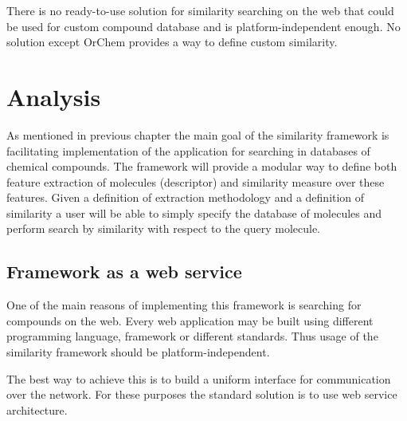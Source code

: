 \documentclass[thesis=M,english]{FITthesis}[2012/10/20]
\begin{document}
There is no ready-to-use solution for similarity searching on the web that could be used for custom compound database and is platform-independent enough. No solution except OrChem provides a way to define custom similarity. 


\chapter{Analysis}
As mentioned in previous chapter the main goal of the similarity framework is facilitating implementation of the application for searching in databases of chemical compounds. The framework will provide a modular way to define both feature extraction of molecules (descriptor) and similarity measure over these features. Given a definition of extraction methodology and a definition of similarity a user will be able to simply specify the database of molecules and perform search by similarity with respect to the query molecule. 

\section{Framework as a web service}
One of the main reasons of implementing this framework is searching for compounds on the web. Every web application may be built using different programming language, framework or different standards. Thus usage of the similarity framework should be platform-independent.

The best way to achieve this is to build a uniform interface for communication over the network. For these purposes the standard solution is to use web service architecture.
\end{document}
